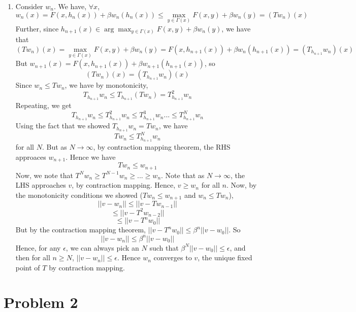 \documentclass[10pt,letter]{article}
\newcommand{\problem}[1]{\section*{Problem #1}}
\begin{document}
\begin{enumerate}[label=(\alph*)]
\item Consider $w_n$. We have, $\forall x$,
\[ w_n(x) = F(x, h_n(x)) + \beta w_n(h_n(x)) \le \max_{y \in \Gamma(x)} F(x, y) + \beta w_n(y) = (Tw_n)(x) \]
Further, since $h_{n+1}(x) \in \arg \max_{y \in \Gamma(x)} F(x, y) + \beta w_n(y)$, we have that
\[ (Tw_n)(x) = \max_{y \in \Gamma(x)} F(x, y) + \beta w_n(y) = F(x, h_{n+1}(x)) + \beta w_n(h_{n+1}(x)) = (T_{h_{n+1}}w_n)(x)   \]
But $w_{n+1}(x) = F(x, h_{n+1}(x)) + \beta w_{n+1}(h_{n+1}(x))$, so
\[ (Tw_n)(x) = (T_{h_{n+1}}w_n)(x) \]
Since $w_n \le Tw_n$, we have by monotonicity,
\[ T_{h_{n+1}}w_n \le T_{h_{n+1}} (Tw_n) = T^2_{h_{n+1}}w_n \]
Repeating, we get
\[ T_{h_{n+1}}w_n  \le T^2_{h_{n+1}}w_n \le T^3_{h_{n+1}}w_n ... \le T^N_{h_{n+1}}w_n \]
Using the fact that we showed $T_{h_{n+1}}w_n = Tw_n$, we have
\[ Tw_n \le T^N_{h_{n+1}}w_n\]
for all $N$. But as $N \to \infty$, by contraction mapping theorem, the RHS approaces $w_{n+1}$. Hence we have
\[ Tw_n \le w_{n+1} \]
Now, we note that $T^N w_n \ge T^{N-1} w_{n} \ge ... \ge w_n $. Note that as $N \to \infty$, the LHS approaches $v$, by contraction mapping. Hence, $v \ge w_n$ for all $n$.
Now, by the monotonicity conditions we showed ($Tw_n \le w_{n+1}$ and $w_n \le Tw_n$),
\[ || v - w_n|| \le || v- Tw_{n-1} || \]
\[ \le || v - T^2w_{n-2}  || \]
\[ \le || v - T^nw_0  || \]
But by the contraction mapping theorem, $|| v - T^n w_0|| \le \beta^n ||v - w_0||$. So
\[ || v - w_n||  \le \beta^n ||v - w_0|| \]
Hence, for any $\epsilon$, we can always pick an $N$ such that $\beta^N ||v - w_0|| \le \epsilon$, and then for all $n\ge N$, $ ||v - w_n || \le \epsilon$. Hence $w_n$ converges to $v$, the unique fixed point of $T$ by contraction mapping.
\end{enumerate}
\problem{2}
\end{document}
